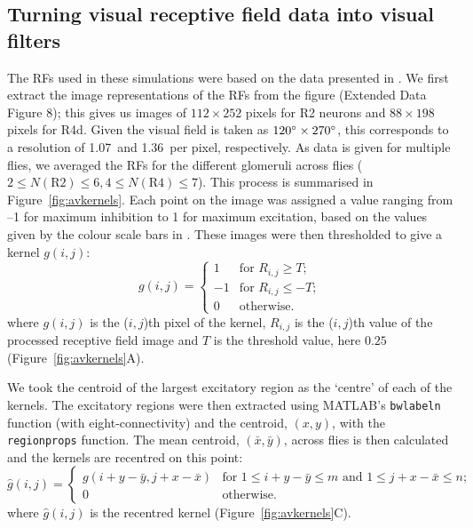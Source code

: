 \documentclass[10pt]{article}
\newcommand{\Matlab}{MATLAB}
\begin{document}
\subsection*{Turning visual receptive field data into visual filters}
\label{sec:methods:preprocessing}
The RFs used in these simulations were based on the data presented in \cite{Seelig2013}.
We first extract the image representations of the RFs from the figure (Extended Data Figure 8); this gives us images of $112\times 252$ pixels for R2 neurons and $88\times 198$ pixels for R4d.
Given the visual field is taken as $120\degree\times 270\degree$, this corresponds to a resolution of 1.07\degree\ and 1.36\degree\ per pixel, respectively.
As data is given for multiple flies, we averaged the RFs for the different glomeruli across flies ($2\le N(\mathrm{R2}) \le 6, 4\le N(\mathrm{R4})\le 7$). This process is summarised in Figure~\ref{fig:avkernels}. Each point on the image was assigned a value ranging from --1 for maximum inhibition to 1 for maximum excitation, based on the values given by the colour scale bars in \cite{Seelig2013}.
These images were then thresholded to give a kernel $g(i,j)$:
$$
g(i,j) = \left\{ \begin{array}{rl}
1 & \mbox{for } R_{i,j} \ge T; \\
-1 & \mbox{for } R_{i,j} \le -T; \\
0 & \mbox{otherwise.}
\end{array}
\right.
$$
where $g(i,j)$ is the ($i,j$)th pixel of the kernel, $R_{i,j}$ is the ($i,j$)th value of the processed receptive field image and $T$ is the threshold value, here $0.25$ (Figure~\ref{fig:avkernels}A).

We took the centroid of the largest excitatory region as the `centre' of each of the kernels.
The excitatory regions were then extracted using \Matlab's \texttt{bwlabeln} function (with eight-connectivity) and the centroid, $(x,y)$, with the \texttt{regionprops} function.
The mean centroid, $(\bar{x},\bar{y})$, across flies is then calculated and the kernels are recentred on this point:
$$
\hat{g}(i,j) = \left\{ \begin{array}{ll} g(i+y-\bar{y},j+x-\bar{x}) & \mbox{for } 1\le i+y-\bar{y}\le m \mbox{ and } 1\le j+x-\bar{x}\le n;\\
0 & \mbox{otherwise.} \end{array} \right.
$$
where $\hat{g}(i,j)$ is the recentred kernel (Figure~\ref{fig:avkernels}C).
\end{document}
